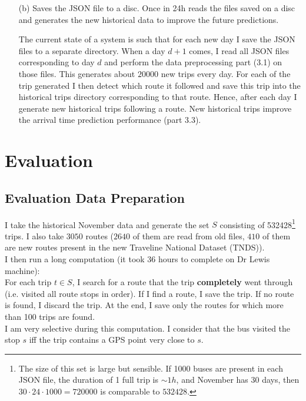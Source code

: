 \documentclass[12pt,a4paper,oneside,openright]{report}
\begin{document}
\begin{enumerate}
\item[(b)] Saves the JSON file to a disc. Once in 24h reads the files saved on a disc
and generates the new historical data to improve the future predictions.

The current state of a system is such that for each new day I save the JSON files
to a separate directory. When a day $d+1$ comes, I read all JSON files corresponding
to day $d$ and perform the data preprocessing part (3.1) on those files. This generates
about $20000$ new trips every day. For each of the trip generated I then detect
which route it followed and save this trip into the historical trips directory
corresponding to that route. Hence, after each day I generate new historical trips
following a route. New historical trips improve the arrival time prediction
performance (part 3.3).

\end{enumerate}

\chapter{Evaluation}

\section{Evaluation Data Preparation}


I take the historical November data and generate the set $S$ consisting of 532428\footnote{
The size of this set is large but sensible. If 1000 buses are present in each JSON file,
the duration of 1 full trip is $\sim1h$, and November has 30 days, 
then $30 \cdot 24 \cdot 1000 = 720000$ is comparable to $532428$.} trips. I also take $3050$ routes
($2640$ of them are read from old files, $410$ of them are new routes present
in the new Traveline National Dataset (TNDS)). \\

I then run a long computation (it took 36 hours to complete on Dr Lewis machine): \\

For each trip $t \in S$, I search for a route that the trip \textbf{completely}
went through (i.e. visited all route stops in order). If I find a route, I save the trip. If no route is found, I discard the
trip. At the end, I save only the routes for which more than 100 trips 
are found. \\

I am very selective during this computation. I consider that the bus visited
the stop $s$ iff the trip contains a GPS point very close to $s$. \\
\end{document}
